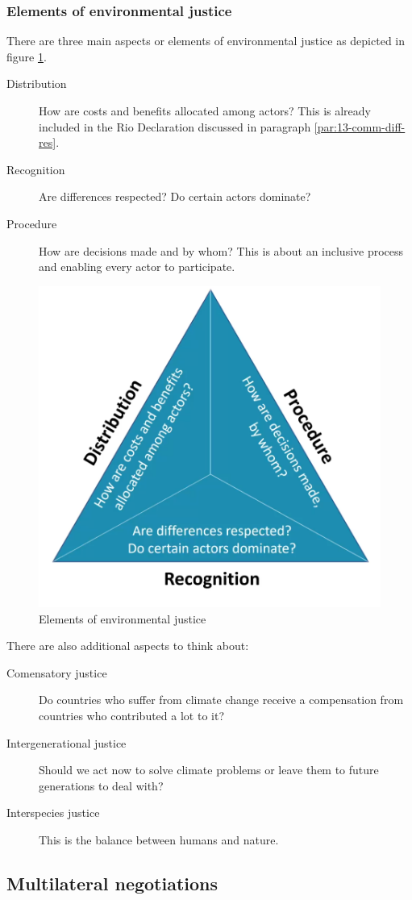 \documentclass[../summary.tex]{subfiles}
\begin{document}
		\subsubsection{Elements of environmental justice}
			There are three main aspects or elements of environmental justice as depicted in figure \ref{fig:13-elements-of-justice}.
			\begin{description}
				\item[Distribution] How are costs and benefits allocated among actors? This is already included in the Rio Declaration discussed in paragraph \ref{par:13-comm-diff-res}.
				\item[Recognition] Are differences respected? Do certain actors dominate?
				\item[Procedure] How are decisions made and by whom? This is about an inclusive process and enabling every actor to participate.
			\end{description}
			\begin{figure}[h]
				\centering
				\includegraphics[width=0.5\linewidth]{../images/13-elements-of-justice.png}
				\caption{Elements of environmental justice}
				\label{fig:13-elements-of-justice}
			\end{figure}
			There are also additional  aspects to think about:
			\begin{description}
				\item[Comensatory justice] Do countries who suffer from climate change receive a compensation from countries who contributed a lot to it?
				\item[Intergenerational justice] Should we act now to solve climate problems or leave them to future generations to deal with?
				\item[Interspecies justice] This is the balance between humans and nature. 
			\end{description}
	\subsection{Multilateral negotiations}
\end{document}
